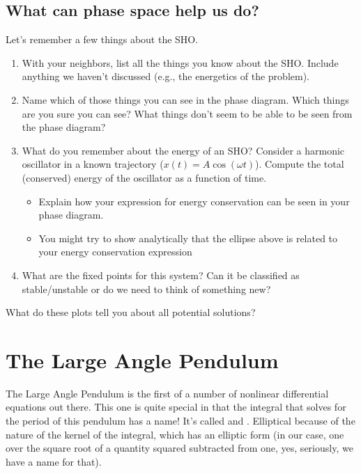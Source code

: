 \documentclass[letterpaper,10pt,english]{jupyterBook}
\begin{document}
\subsection{What can phase space help us do?}
\label{\detokenize{content/1_mechanics/dynamical_1:what-can-phase-space-help-us-do}}
\sphinxAtStartPar
{}

\sphinxAtStartPar
Let’s remember a few things about the SHO.
\begin{enumerate}
%
\item {} 
\sphinxAtStartPar
With your neighbors, list all the things you know about the SHO. Include anything we haven’t discussed (e.g., the energetics of the problem).

\item {} 
\sphinxAtStartPar
Name which of those things you can see in the phase diagram. Which things are you sure you can see? What things don’t seem to be able to be seen from the phase diagram?

\item {} 
\sphinxAtStartPar
What do you remember about the energy of an SHO? Consider a harmonic oscillator in a known trajectory (\(x(t) = A\cos(\omega t)\)). Compute the total (conserved) energy of the oscillator as a function of time.
\begin{itemize}
\item {} 
\sphinxAtStartPar
Explain how your expression for energy conservation can be seen in your phase diagram.

\item {} 
\sphinxAtStartPar
You might try to show analytically that the ellipse above is related to your energy conservation expression

\end{itemize}

\item {} 
\sphinxAtStartPar
What are the fixed points for this system? Can it be classified as stable/unstable or do we need to think of something new?

\end{enumerate}

\sphinxAtStartPar
What do these plots tell you about all potential solutions?


\section{The Large Angle Pendulum}
\label{\detokenize{content/1_mechanics/dynamical_1:the-large-angle-pendulum}}
\sphinxAtStartPar
The Large Angle Pendulum is the first of a number of nonlinear differential equations out there. This one is quite special in that the integral that solves for the period of this pendulum has a name! It’s called and . Elliptical because of the nature of the kernel of the integral, which has an elliptic form (in our case, one over the square root of a quantity squared subtracted from one, yes, seriously, we have a name for that).
\end{document}
